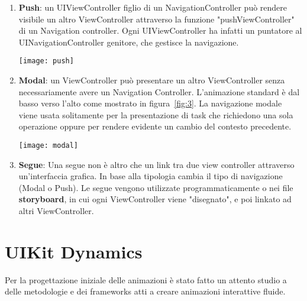 \begin{enumerate}
    \item{\textbf{Push}: un UIViewController figlio di un NavigationController può rendere
    visibile un altro ViewController attraverso la funzione 
    "pushViewController" di un Navigation controller. Ogni UIViewController ha
    infatti un puntatore al UINavigationController genitore, che gestisce la navigazione.

    \par
    \begin{minipage}{\linewidth}
        \centering
        \texttt{[image: push]}
        \label{fig:2}
    \end{minipage}
    }
    \item{ \textbf{Modal}: un ViewController può presentare un altro ViewController senza necessariamente avere un 
        Navigation Controller. L'animazione standard è dal basso verso l'alto come mostrato in figura~\ref{fig:3}. La navigazione modale viene
        usata solitamente per la presentazione di task che richiedono una sola operazione oppure per rendere evidente un cambio del contesto precedente.
        \par
        \begin{minipage}{\linewidth}
            \centering
            \texttt{[image: modal]}
            \label{fig:3}
        \end{minipage}
    }
    \item{\textbf{Segue}: Una segue non è altro che un link tra due view controller attraverso un'interfaccia
        grafica. In base alla tipologia cambia il tipo di navigazione (Modal o Push). Le segue vengono utilizzate programmaticamente o nei file \textbf{storyboard}, in cui
        ogni ViewController viene "disegnato", e poi linkato ad altri ViewController.
    }
\end{enumerate}

\section{UIKit Dynamics}

Per la progettazione iniziale delle animazioni è stato fatto un attento studio a delle metodologie e dei frameworks
atti a creare animazioni interattive fluide.


